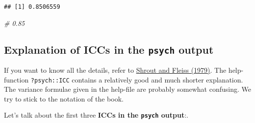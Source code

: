 \documentclass[
]{book}
\newenvironment{Shaded}{\begin{snugshade}}{\end{snugshade}}
\newcommand{\CommentTok}[1]{\textcolor[rgb]{0.56,0.35,0.01}{\textit{#1}}}
\begin{document}
\begin{verbatim}
## [1] 0.8506559
\end{verbatim}

\begin{Shaded}
\begin{Highlighting}[]
\CommentTok{\# 0.85}
\end{Highlighting}
\end{Shaded}

\subsection{\texorpdfstring{Explanation of ICCs in the \texttt{psych} output}{Explanation of ICCs in the psych output}}\label{explanation-of-iccs-in-the-psych-output}

If you want to know all the details, refer to \href{https://d1wqtxts1xzle7.cloudfront.net/50483847/syarat_reliabilitas_icc-libre.pdf?1479841049=&response-content-disposition=inline\%3B+filename\%3DIntraclass_Correlations_Uses_in_Assessin.pdf&Expires=1740684631&Signature=hHiFbcQD3PDVIyWDJ-bUhcm3WtsK19YhHm6FKtnafNdqsm9NhR6cr9lbCf~gVV5SYG1XlTwLlcfJkQ9Z-ahjmmNV893aWi5plo~yL4oZBEjrmFa9WCd7k6vzFTkri1Xbgfh~GyPARWXBtqABytovtL-RD1420Kw9qk150nw3-kUWcuvRiIc~r0y65XQaXf-V9mm~uXRFdUqec4Vs-Bwh~IrJfHWQASGgp8wZjzh2130MCP3-iaorxNn~79c~nm2f1aIl5WRqRXB6EIy8HlrNFpxNSt1pgTPZoZadEECM4qH395KLY5ijUnhoCDT9AmcOplPnFiC5t8dKW-n25ziofQ__&Key-Pair-Id=APKAJLOHF5GGSLRBV4ZA}{Shrout and Fleiss (1979)}.
The help-function \texttt{?psych::ICC} contains a relatively good and much shorter explanation.
The variance formulae given in the help-file are probably somewhat confusing.
We try to stick to the notation of the book.

Let's talk about the first three \textbf{ICCs in the \texttt{psych} output}:.
\end{document}
